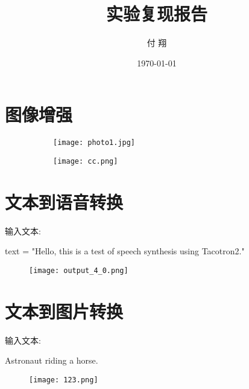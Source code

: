 \documentclass{article}
\title{实验复现报告}
\date{\today}
\author{ 付 翔 }
\begin{document}
\maketitle

\tableofcontents

\newpage

\section{图像增强}


\begin{figure}[h!]
    \centering
    \begin{subfigure}{0.4\textwidth}
        \centering
        \texttt{[image: photo1.jpg]}
        \caption{}
        \label{fig:subfig1}
    \end{subfigure}
    \hfill
    \begin{subfigure}{0.4\textwidth}
        \centering  
        \texttt{[image: cc.png]}
        \caption{}
        \label{fig:subfig2}
    \end{subfigure}

\end{figure}

\section{文本到语音转换}

输入文本:

text = "Hello, this is a test of speech synthesis using Tacotron2."

\begin{figure}[h!]
        \centering
        \texttt{[image: output\_4\_0.png]}

\end{figure}



\newpage


\section{文本到图片转换}

输入文本:


Astronaut riding a horse.

\begin{figure}[h!]
    \centering
    \texttt{[image: 123.png]}

\end{figure}
\end{document}
